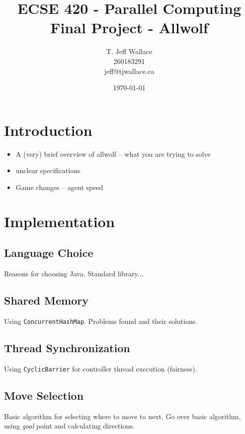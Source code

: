 \documentclass[pdftex,10pt]{article}
\begin{document}
\title{ECSE 420 - Parallel Computing \\ Final Project - Allwolf}
\author{T. Jeff Wallace \\ 260183291 \\ jeff@tjwallace.ca}
\date{\today}
\maketitle
\clearpage

\tableofcontents
\lstlistoflistings
\clearpage


\section{Introduction}\label{intro}
\begin{itemize}
	\item A (very) brief overview of allwolf -- what you are trying to solve
	\item unclear specifications
	\item Game changes -- agent speed
\end{itemize}

\section{Implementation}\label{impl}
\subsection{Language Choice}\label{language}
Reasons for choosing Java.  Standard library...

\subsection{Shared Memory}\label{sharedMemory}
Using {\tt ConcurrentHashMap}.  Problems found and their solutions.

\subsection{Thread Synchronization}\label{threadSync}
Using {\tt CyclicBarrier} for controller thread execution (fairness).

\subsection{Move Selection}\label{moveSel}
Basic algorithm for selecting where to move to next.  Go over basic algorithm, using {\em goal} point and calculating directions.
\end{document}
